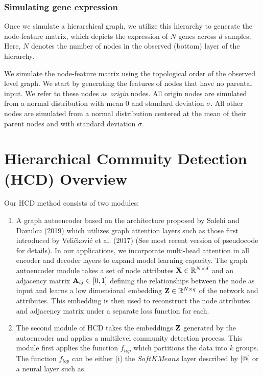 \documentclass[
]{article}
\begin{document}
\subsubsection*{Simulating gene
expression}\label{simulating-gene-expression}

Once we simulate a hierarchical graph, we utilize this hierarchy to
generate the node-feature matrix, which depicts the expression of \(N\)
genes across \(d\) samples. Here, \(N\) denotes the number of nodes in
the observed (bottom) layer of the hierarchy.

We simulate the node-feature matrix using the topological order of the
observed level graph. We start by generating the features of nodes that
have no parental input. We refer to these nodes as \emph{origin} nodes.
All origin nodes are simulated from a normal distribution with mean
\(0\) and standard deviation \(\sigma\). All other nodes are simulated
from a normal distribution centered at the mean of their parent nodes
and with standard deviation \(\sigma\).

\section*{Hierarchical Commuity Detection (HCD)
Overview}\label{hierarchical-commuity-detection-hcd-overview}

Our HCD method consists of two modules:

\begin{enumerate}
\def\labelenumi{\arabic{enumi}.}
\item
  A graph autoencoder based on the architecture proposed by Salehi and
  Davulcu (2019) which utilizes graph attention layers such as those
  first introduced by Veličković et al. (2017) (See most recent version
  of pseudocode for details). In our applications, we incorporate
  multi-head attention in all encoder and decoder layers to expand model
  learning capacity. The graph autoencoder module takes a set of node
  attributes \({\bf X}\in\mathbb{R}^{N \times d}\) and an adjacency
  matrix \({\bf A}_{ij}\in[0,1]\) defining the relationships between the
  node as input and learns a low dimensional embedding
  \({\bf Z} \in \mathbb{R}^{N \times q}\) of the network and attributes.
  This embedding is then used to reconstruct the node attributes and
  adjacency matrix under a separate loss function for each.
\item
  The second module of HCD takes the embeddings \({\bf Z}\) generated by
  the autoencoder and applies a multilevel community detection process.
  This module first applies the function \(f_{top}\) which partitions
  the data into \(k\) groups. The function \(f_{top}\) can be either (i)
  the \(SoftKMeans\) layer described by {[}@{]} or a neural layer such
  as
\end{enumerate}
\end{document}
